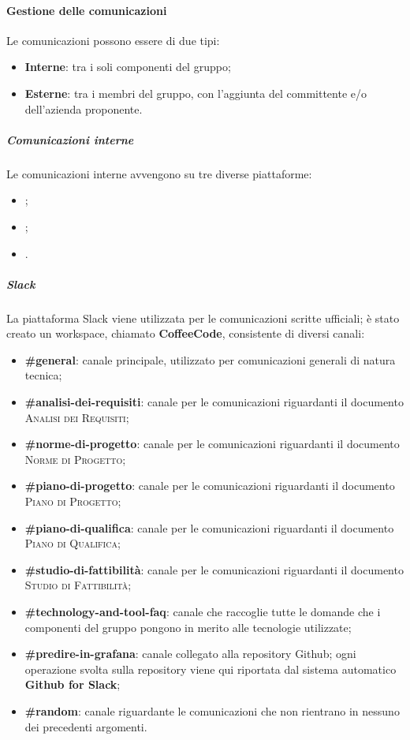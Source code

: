 \documentclass[../norme-di-progetto.tex]{subfiles}
\begin{document}
\paragraph{Gestione delle comunicazioni}
Le comunicazioni possono essere di due tipi:
\begin{itemize}
  \item \textbf{Interne}: tra i soli componenti del gruppo;
  \item \textbf{Esterne}: tra i membri del gruppo, con l'aggiunta del committente e/o dell'azienda proponente.
\end{itemize}
\subparagraph{Comunicazioni interne}
Le comunicazioni interne avvengono su tre diverse piattaforme:
\begin{itemize}
  \item {};
  \item {};
  \item {}.
\end{itemize}
\subparagraph*{Slack}
La piattaforma Slack viene utilizzata per le comunicazioni scritte ufficiali; è stato creato un workspace, chiamato \textbf{CoffeeCode}, consistente di diversi canali:
\begin{itemize}
  \item \textbf{\#general}: canale principale, utilizzato per comunicazioni generali di natura tecnica;
  \item \textbf{\#analisi-dei-requisiti}: canale per le comunicazioni riguardanti il documento \textsc{Analisi dei Requisiti};
  \item \textbf{\#norme-di-progetto}: canale per le comunicazioni riguardanti il documento \textsc{Norme di Progetto};
  \item \textbf{\#piano-di-progetto}: canale per le comunicazioni riguardanti il documento \textsc{Piano di Progetto};
  \item \textbf{\#piano-di-qualifica}: canale per le comunicazioni riguardanti il documento \textsc{Piano di Qualifica};
  \item \textbf{\#studio-di-fattibilità}: canale per le comunicazioni riguardanti il documento \textsc{Studio di Fattibilità};
  \item \textbf{\#technology-and-tool-faq}: canale che raccoglie tutte le domande che i componenti del gruppo pongono in merito alle tecnologie utilizzate;
  \item \textbf{\#predire-in-grafana}: canale collegato alla repository Github; ogni operazione svolta sulla repository viene qui riportata dal sistema automatico \textbf{Github for Slack};
  \item \textbf{\#random}: canale riguardante le comunicazioni che non rientrano in nessuno dei precedenti argomenti.
\end{itemize}
\end{document}
